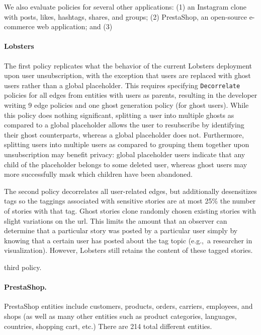 We also evaluate policies for several other applications: (1) an Instagram clone with posts, likes,
hashtags, shares, and groups; (2) PrestaShop, an open-source e-commerce web application; and (3)

\paragraph{Lobsters}

The first policy replicates what the behavior of the current Lobsters deployment upon user
unsubscription, with the exception that users are replaced with ghost users rather than a global
placeholder. This requires specifying \texttt{Decorrelate} policies for all edges from entities with users
as parents, resulting in the developer writing 9 edge policies and one ghost generation policy (for
ghost users). While this policy does nothing significant, splitting a user into multiple ghosts as
compared to a global placeholder allows the user to resubscribe by identifying their ghost
counterparts, whereas a global placeholder does not. Furthermore, splitting users into multiple
users as compared to grouping them together upon unsubscription may benefit privacy: global
placeholder users indicate that any child of the placeholder belongs to some deleted user, whereas
ghost users may more successfully mask which children have been abandoned.

The second policy decorrelates all user-related edges, but additionally desensitizes tags so the
taggings associated with sensitive stories are at most 25\% the number of stories with that tag.
Ghost stories clone randomly chosen existing stories with slight variations on the url.
This limits the amount that an observer can determine that a particular story was posted by a
particular user simply by knowing that a certain user has posted about the tag topic (e.g.,\ a researcher 
in visualization). However, Lobsters still retains the content of these tagged stories.

 third policy.
\paragraph{PrestaShop.} 
PrestaShop entities include customers, products, orders, carriers, employees, and shops (as well as
many other entities such as product categories, languages, countries, shopping cart, etc.) There are
214 total different entities. 

